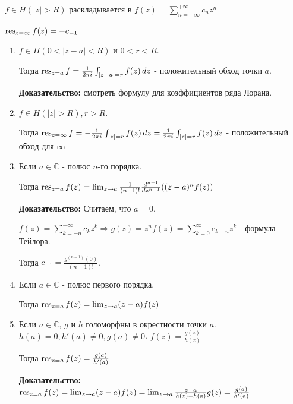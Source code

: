 \begin{definition}
    $f \in H(|z| > R)$ раскладывается в $f(z) = \sum_{n = -\infty}^{+\infty} c_n z^n$

    $\operatorname{res}_{z = \infty} f(z) = -c_{-1}$
\end{definition}

\begin{properties}
    \begin{enumerate}
        \item $f \in H(0 < |z - a| < R)$ и $0 < r < R$.

        Тогда $\operatorname{res}_{z = a} f = \frac{1}{2\pi i} \int_{|z - a| = r} f(z) \, dz$ - положительный обход
        точки $a$.

        \textbf{Доказательство:} смотреть формулу для коэффициентов ряда Лорана.

        \item $f \in H(|z| > R), r > R$.

        Тогда $\operatorname{res}_{z = \infty} f = -\frac{1}{2\pi i} \int_{|z| = r} f(z) \, dz = \frac{1}{2\pi i} \int_{|z| = r} f(z) \, dz$ -
        положительный обход для $\infty$

        \item Если $a \in \mathbb{C}$ - полюс $n$-го порядка.

        Тогда $\operatorname{res}_{z = a} f(z) = \lim_{z \to a} \frac{1}{(n - 1)!} \frac{d^{n - 1}}{dz^{n - 1}} ((z - a)^n f(z))$

        \textbf{Доказательство:} Считаем, что $a = 0$.

        $f(z) = \sum_{k = -n}^{+\infty} c_kz^k \Rightarrow g(z) = z^n f(z) = \sum_{k = 0}^{\infty} c_{k - n}z^k $ - формула Тейлора.

        Тогда $c_{-1} = \frac{g^{(n - 1)}(0)}{(n - 1)!}$.

        \item Если $a \in \mathbb{C}$ - полюс первого порядка.

        Тогда $\operatorname{res}_{z = a} f(z) = \lim_{z \to a} (z - a)f(z)$

        \item Если $a \in \mathbb{C}$, $g$ и $h$ голоморфны в окрестности точки $a$.
        $h(a) = 0, h'(a) \neq 0, g(a) \neq 0$. $f(z) = \frac{g(z)}{h(z)}$

        Тогда $\operatorname{res}_{z = a} f(z) = \frac{g(a)}{h'(a)}$

        \textbf{Доказательство:} $\operatorname{res}_{z = a} f(z) = \lim_{z \to a} (z - a)f(z) =
        \lim_{z \to a} \frac{z - a}{h(z) - h(a)} g(z) = \frac{g(a)}{h'(a)}$


\end{enumerate}
\end{properties}
